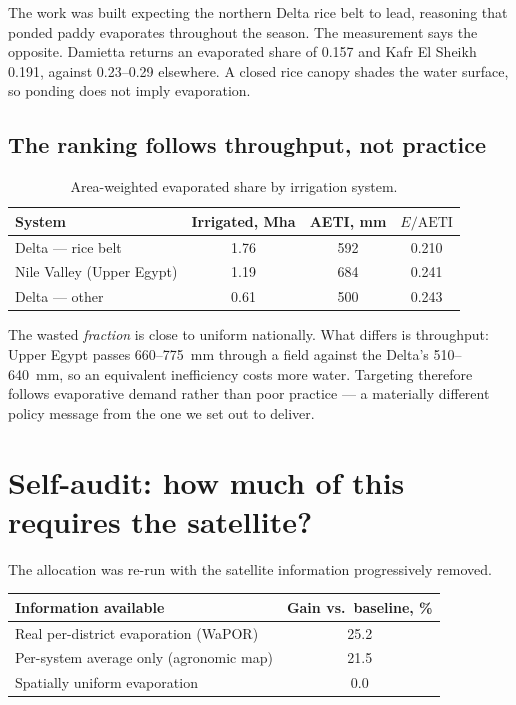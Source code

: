 \documentclass[11pt,a4paper]{article}
\begin{document}
The work was built expecting the northern Delta rice belt to lead, reasoning that
ponded paddy evaporates throughout the season. The measurement says the opposite.
Damietta returns an evaporated share of \num{0.157} and Kafr El Sheikh
\num{0.191}, against \num{0.23}--\num{0.29} elsewhere. A closed rice canopy
shades the water surface, so ponding does not imply evaporation.

\subsection{The ranking follows throughput, not practice}

\begin{table}[h]\centering\small
\caption{Area-weighted evaporated share by irrigation system.}
\begin{tabular}{lS[table-format=1.2]S[table-format=3.0]S[table-format=1.3]}
\toprule
System & {Irrigated, Mha} & {AETI, \si{\milli\metre}} & {$E/\text{AETI}$} \\
\midrule
Delta --- rice belt        & 1.76 & 592 & 0.210 \\
Nile Valley (Upper Egypt)  & 1.19 & 684 & 0.241 \\
Delta --- other            & 0.61 & 500 & 0.243 \\
\bottomrule
\end{tabular}
\end{table}

The wasted \emph{fraction} is close to uniform nationally. What differs is
throughput: Upper Egypt passes 660--\SI{775}{\milli\metre} through a field
against the Delta's 510--\SI{640}{\milli\metre}, so an equivalent inefficiency
costs more water. Targeting therefore follows evaporative demand rather than poor
practice --- a materially different policy message from the one we set out to
deliver.

\section{Self-audit: how much of this requires the satellite?}

The allocation was re-run with the satellite information progressively removed.

\begin{table}[h]\centering\small
\begin{tabular}{lS[table-format=2.1]}
\toprule
Information available & {Gain vs.\ baseline, \%} \\
\midrule
Real per-district evaporation (WaPOR)      & 25.2 \\
Per-system average only (agronomic map)    & 21.5 \\
Spatially uniform evaporation              & 0.0 \\
\bottomrule
\end{tabular}
\end{table}
\end{document}
